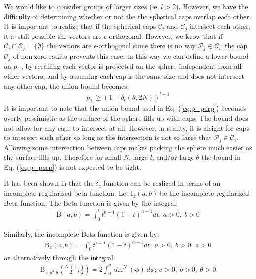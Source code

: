 We would like to consider groups of larger sizes (ie. $l> 2$). However, we have the difficulty of determining whether or not the the spherical caps overlap each other. It is important to realize that if the spherical caps $\mathcal{C}_i$ and $\mathcal{C}_j$ intersect each other, it is still possible the vectors are $\epsilon$-orthogonal. However, we know that if $\mathcal{C}_i\cap\mathcal{C}_j = \lbrace \emptyset \rbrace$ the vectors are $\epsilon$-orthogonal since there is no way $\mathcal{P}_j\in\mathcal{C}_i$: the cap $\mathcal{C}_j$ of non-zero radius prevents this case. In this way we can define a lower bound on $p_\perp$, by recalling each vector is projected on the sphere independent from all other vectors, and by assuming each cap is the same size and does not intersect any other cap, the union bound becomes:
\begin{equation}\label{eq:p_perp}
    \begin{aligned}
        p_{\perp} \geq (1-\delta_c(\theta,2N))^{l-1}
    \end{aligned}
\end{equation}
It is important to note that the union bound used in Eq. (\ref{eq:p_perp}) becomes overly pessimistic as the surface of the sphere fills up with caps. The bound does not allow for any caps to intersect at all. However, in reality, it is alright for caps to intersect each other so long as the intersection is not so large that $\mathcal{P}_j\in\mathcal{C}_i$. Allowing some intersection between caps makes packing the sphere much easier as the surface fills up. Therefore for small $N$, large $l$, and/or large $\theta$ the bound in Eq. (\ref{eq:p_perp}) is not expected to be tight.

It has been shown in \cite{Li2011} that the $\delta_c$ function can be realized in terms of an incomplete regularized beta function. Let $\text{I}_z(a,b)$ be the incomplete regularized Beta function. The Beta function is given by the integral:
\begin{equation}\label{eq:beta}
    \begin{aligned}
        \text{B}(a,b) = \int_0^1 t^{b-1}(1-t)^{a-1}dt; \ a>0,\ b>0
    \end{aligned}
\end{equation}

Similarly, the incomplete Beta function is given by:
\begin{equation}\label{eq:beta_inc}
    \begin{aligned}
        \text{B}_z(a,b) = \int_0^z t^{b-1}(1-t)^{a-1}dt; \ a>0,\ b>0,\ z>0
    \end{aligned}
\end{equation}
or alternatively through the integral:
\begin{equation}\label{eq:beta_inc_sin}
    \begin{aligned}
        \text{B}_{\sin^2\theta}(\frac{N+1}{2},\frac{1}{2}) = 2\int_0^\theta \sin^N (\phi)\ d\phi; \ a>0,\ b>0,\ \theta>0
    \end{aligned}
\end{equation}

